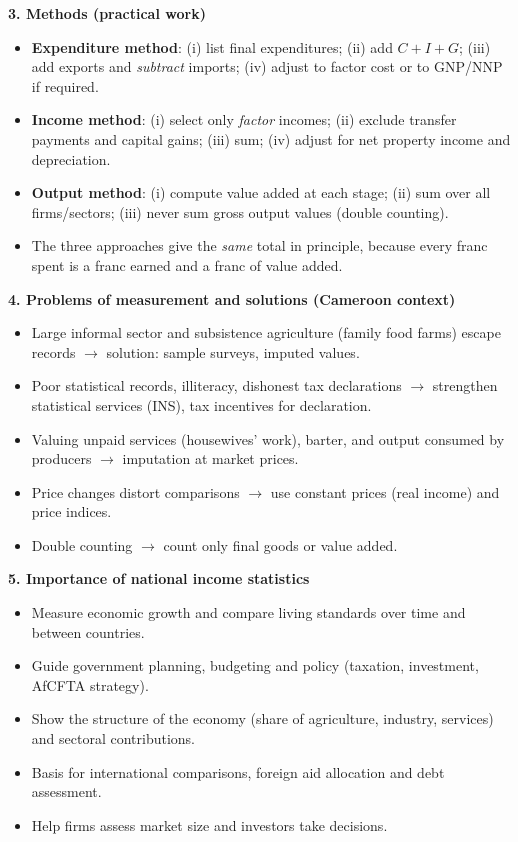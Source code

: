 \documentclass[11pt]{article}
\newcommand{\cle}[1]{{\popxbold\color{popdark}#1}}
\begin{document}
\begin{bilan}
\textbf{3. Methods (practical work)}\par
\begin{itemize}
\item \textbf{Expenditure method}: (i) list final expenditures; (ii) add $C+I+G$; (iii) add exports and \emph{subtract} imports; (iv) adjust to factor cost or to GNP/NNP if required.
\item \textbf{Income method}: (i) select only \emph{factor} incomes; (ii) exclude transfer payments and capital gains; (iii) sum; (iv) adjust for net property income and depreciation.
\item \textbf{Output method}: (i) compute value added at each stage; (ii) sum over all firms/sectors; (iii) never sum gross output values (double counting).
\item The three approaches give the \emph{same} total in principle, because every franc spent is a franc earned and a franc of value added.
\end{itemize}

\textbf{4. Problems of measurement and solutions (Cameroon context)}\par
\begin{itemize}
\item Large \cle{informal sector} and \cle{subsistence agriculture} (family food farms) escape records $\rightarrow$ solution: sample surveys, imputed values.
\item Poor statistical records, illiteracy, dishonest tax declarations $\rightarrow$ strengthen statistical services (INS), tax incentives for declaration.
\item Valuing unpaid services (housewives' work), barter, and output consumed by producers $\rightarrow$ imputation at market prices.
\item Price changes distort comparisons $\rightarrow$ use constant prices (real income) and price indices.
\item Double counting $\rightarrow$ count only final goods or value added.
\end{itemize}

\textbf{5. Importance of national income statistics}\par
\begin{itemize}
\item Measure \cle{economic growth} and compare living standards over time and between countries.
\item Guide government \cle{planning}, budgeting and policy (taxation, investment, AfCFTA strategy).
\item Show the \cle{structure} of the economy (share of agriculture, industry, services) and sectoral contributions.
\item Basis for \cle{international comparisons}, foreign aid allocation and debt assessment.
\item Help firms assess market size and investors take decisions.
\end{itemize}


\end{bilan}
\end{document}
